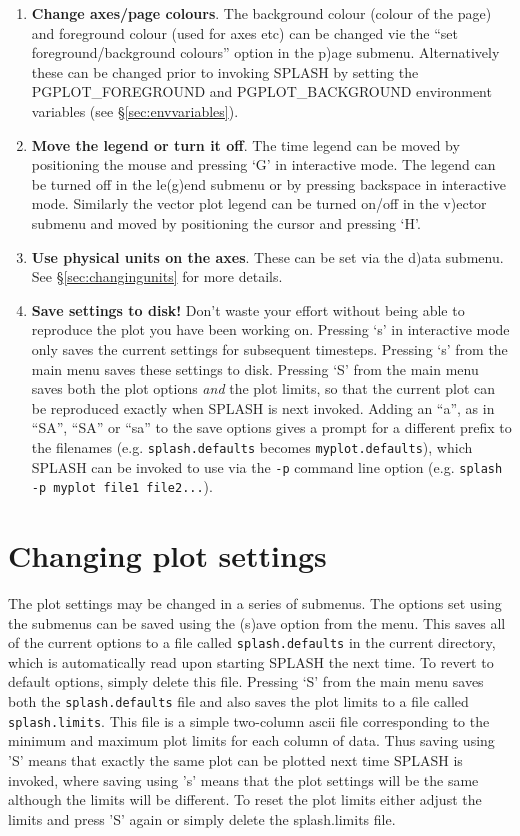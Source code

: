 \documentclass[a4paper,10pt]{article}
\newcommand{\splash}{\textsc{SPLASH }}
\begin{document}
\begin{enumerate}
\item {\bf Change axes/page colours}. The background colour (colour of the page) and foreground colour (used for axes etc) can be changed vie the ``set foreground/background colours'' option in the p)age submenu. Alternatively these can be changed prior to invoking \splash by setting the PGPLOT\_FOREGROUND and PGPLOT\_BACKGROUND environment variables (see \S\ref{sec:envvariables}).
\item {\bf Move the legend or turn it off}. The time legend can be moved by positioning the mouse and pressing `G' in interactive mode. The legend can be turned off in the le(g)end submenu or by pressing backspace in interactive mode. Similarly the vector plot legend can be turned on/off in the v)ector submenu and moved by positioning the cursor and pressing `H'.
\item {\bf Use physical units on the axes}. These can be set via the d)ata submenu. See \S\ref{sec:changingunits} for more details.
\item {\bf Save settings to disk!} Don't waste your effort without being able to reproduce the plot you have been working on. Pressing `s' in interactive mode only saves the current settings for subsequent timesteps. Pressing `s' from the main menu saves these settings to disk. Pressing `S' from the main menu saves both the plot options \emph{and} the plot limits, so that the current plot can be reproduced exactly when \splash is next invoked. Adding an ``a'', as in ``SA'', ``SA'' or ``sa'' to the save options gives a prompt for a different prefix to the filenames (e.g. \verb+splash.defaults+ becomes \verb+myplot.defaults+), which \splash can be invoked to use via the \verb+-p+ command line option (e.g. \verb+splash -p myplot file1 file2...+).
\end{enumerate}

\section{Changing plot settings}
 The plot settings may be changed in a series of submenus. The options set using
the submenus can be saved using the (s)ave option from the menu. This saves all of
the current options to a file called \verb+splash.defaults+ in the current directory, which is
automatically read upon starting \splash the next time. To revert to default options, simply delete this file.
Pressing `S' from the main menu saves both the \verb+splash.defaults+ file and also saves the plot limits to a file called \verb+splash.limits+. This file is a simple two-column ascii file corresponding to the minimum and maximum plot limits for each column of data. Thus saving using 'S' means that exactly the same plot can be plotted next time \splash is invoked, where saving using 's' means that the plot settings will be the same although the limits will be different. To reset the plot limits either adjust the limits and press 'S' again or simply delete the splash.limits file.
\end{document}
